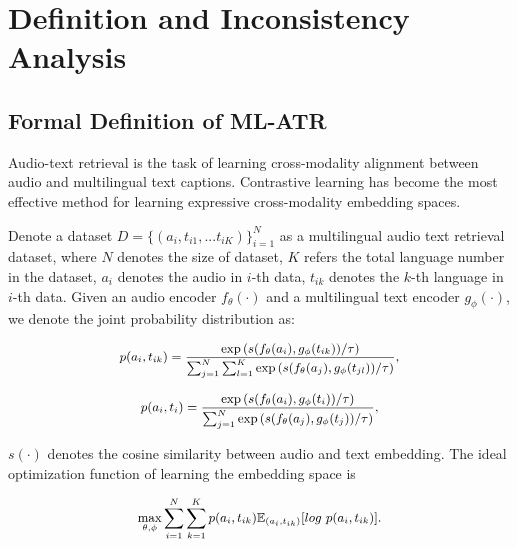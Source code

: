 \section{Definition and Inconsistency Analysis}
\label{Sect:Mathematical Demonstration about Inconsistency}
\subsection{Formal Definition of ML-ATR}
Audio-text retrieval is the task of learning cross-modality alignment between audio and multilingual text captions. Contrastive learning \cite{ru2023imbalanced,zhuang2025vargpt} has become the most effective method for learning expressive cross-modality embedding spaces.

Denote a dataset $D=\{(a_i, t_{i1},...t_{iK})\}_{i=1}^N$ as a multilingual audio text retrieval dataset, where $N$ denotes the size of dataset, $K$ refers the total language number in the dataset, $a_i$ denotes the audio in $i$-th data, $t_{ik}$ denotes the $k$-th language in $i$-th data. Given an audio encoder $f_\theta (\cdot)$ and a multilingual text encoder $g_\phi(\cdot)$, we denote the joint probability distribution as:

\begin{equation}
\label{Eq:origin distribution}
\small
    \begin{aligned}
        p(a_i,t_{ik})= \frac{\exp\left(s(f_\theta(a_i), g_\phi(t_{ik})) / \tau \right)}
  {\sum_{j=1}^N\sum_{l=1}^K \exp\left(s(f_\theta(a_j), g_\phi(t_{jl})) / \tau \right)},
    \end{aligned}
\end{equation}

\begin{equation}
\label{Eq:origin distribution}
\small
    \begin{aligned}
        p(a_i,t_{i})= \frac{\exp\left(s(f_\theta(a_i), g_\phi(t_{i})) / \tau \right)}
  {\sum_{j=1}^N \exp\left(s(f_\theta(a_j), g_\phi(t_{j})) / \tau \right)},
    \end{aligned}
\end{equation}

$s(\cdot)$ denotes the cosine similarity between audio and text embedding. The ideal optimization function of learning the embedding space is

\begin{equation}
\small
\begin{aligned}
\max_{\theta, \phi}\sum^{N}_{i=1}\sum^{K}_{k=1}p(a_i,t_{ik}) \mathbb{E}_{(a_i,t_{ik})}[log\ p(a_i,t_{ik})].
\end{aligned}
\end{equation}

